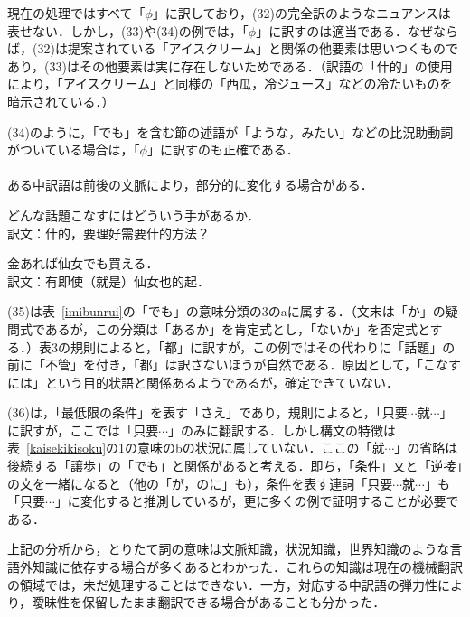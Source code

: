 現在の処理ではすべて「$\phi$」に訳しており，(32)の完全訳のようなニュアンスは表せない．しかし，(33)や(34)の例では，「$\phi$」に訳すのは適当である．なぜならば，(32)は提案されている「アイスクリーム」と関係の他要素は思いつくものであり，(33)はその他要素は実に存在しないためである．（訳語の「什的」の使用により，「アイスクリーム」と同様の「西瓜，冷ジュース」などの冷たいものを暗示されている．）

(34)のように，「でも」を含む節の述語が「ような，みたい」などの比況助動詞がついている場合は，「$\phi$」に訳すのも正確である．

\paragraph{}
ある中訳語は前後の文脈により，部分的に変化する場合がある．

\begin{enumerates}
 \setcounter{enumi}{34}
 \item どんな話題こなすにはどういう手があるか． \\
       訳文：什的，要理好需要什的方法？
 \item 金あれば仙女でも買える．\\
       訳文：有即使（就是）仙女也的起．
\end{enumerates}

(35)は表~\ref{imibunrui}の「でも」の意味分類の3のaに属する．（文末は「か」の疑問式であるが，この分類は「あるか」を肯定式とし，「ないか」を否定式とする．）表3の規則によると，「都」に訳すが，この例ではその代わりに「話題」の前に「不管」を付き，「都」は訳さないほうが自然である．原因として，「こなすには」という目的状語と関係あるようであるが，確定できていない．

(36)は，「最低限の条件」を表す「さえ」であり，規則によると，「只要$\cdots$就$\cdots$」に訳すが，ここでは「只要$\cdots$」のみに翻訳する．しかし構文の特徴は表~\ref{kaisekikisoku}の1の意味のbの状況に属していない．ここの「就$\cdots$」の省略は後続する「譲歩」の「でも」と関係があると考える．即ち，「条件」文と「逆接」の文を一緒になると（他の「が，のに」も），条件を表す連詞「只要$\cdots$就$\cdots$」も「只要$\cdots$」に変化すると推測しているが，更に多くの例で証明することが必要である．

上記の分析から，とりたて詞の意味は文脈知識，状況知識，世界知識のような言語外知識に依存する場合が多くあるとわかった．これらの知識は現在の機械翻訳の領域では，未だ処理することはできない．一方，対応する中訳語の弾力性により，曖昧性を保留したまま翻訳できる場合があることも分かった．

